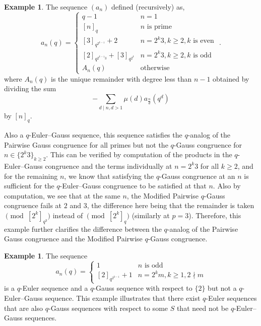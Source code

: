 \documentclass{article}
\numberwithin{equation}{section}
\theoremstyle{definition}
\newtheorem{example}[definition]{\bf {Example}}
\begin{document}
\begin{example}
    The sequence $(a_n)$ defined (recursively) as,
\[a_n(q)=
    \begin{cases}
        q-1&n=1\\
        [n]_q&n \text{ is prime}\\
        [3]_{q^{2^{k-1}}}+2&n=2^k3, k\geq2, k \text{ is even}\\
        [2]_{q^{2^{k-1}3}}+[3]_{q^{2^k}}&n=2^k3, k\geq2, k \text{ is odd}\\
        A_n(q)&\text{otherwise}
    \end{cases}\text{ .}\]
where $A_n(q)$ is the unique remainder with degree less than $n-1$ obtained by dividing the sum \[-\sum_{d\mid n, d>1}
\mu(d)a_{\frac{n}{d}}(q^d)\] by $[n]_q$.

Also a $q$-Euler--Gauss sequence, this sequence satisfies the $q$-analog of the Pairwise Gauss congruence for all primes but not the $q$-Gauss congruence for $n\in\{2^k3\}_{k\geq2}$. This can be verified by computation of the products in the $q$-Euler--Gauss congruence and the terms individually at $n=2^k3$ for all $k\geq2$, and for the remaining $n$, we know that satisfying the $q$-Gauss congruence at an $n$ is sufficient for the $q$-Euler--Gauss congruence to be satisfied at that $n$. 
Also by computation, we see that at the same $n$, the Modified Pairwise $q$-Gauss congruence fails at $2$ and $3$, the difference here being that the remainder is taken $\pmod{[2^k]_{q^3}}$ instead of $\pmod{[2^k]_{q}}$ (similarly at $p=3$). Therefore, this example further clarifies the difference between the $q$-analog of the Pairwise Gauss congruence and the Modified Pairwise $q$-Gauss congruence.
\end{example}
\begin{example}
    The sequence 
\[
    a_n(q)=
    \begin{cases}
        1&n\text{ is odd}\\
        [2]_{q^{2^{k-1}}}+1&n=2^km, k\geq1, 2\nmid m
    \end{cases}
\]
is a $q$-Euler sequence and a $q$-Gauss sequence with respect to $\{2\}$ but not a $q$-Euler--Gauss sequence. This example illustrates that there exist $q$-Euler sequences that are also $q$-Gauss sequences with respect to some $S$ that need not be $q$-Euler--Gauss sequences.
\end{example}
\end{document}
